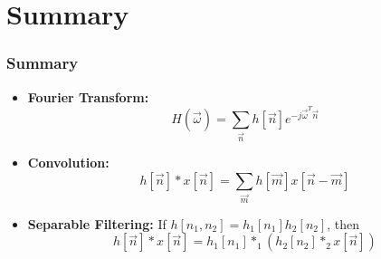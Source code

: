 \documentclass{beamer}
\begin{document}
\section{Summary}
\setcounter{subsection}{1}

\begin{frame}
  \frametitle{Summary}
  \begin{itemize}
  \item {\bf Fourier Transform:}
    \[
    H(\vec\omega) = \sum_{\vec{n}} h[\vec{n}] e^{-j\vec\omega^T\vec{n}}
    \]
  \item {\bf Convolution:}
    \[
    h[\vec{n}]\ast x[\vec{n}] = \sum_{\vec{m}} h[\vec{m}] x[\vec{n}-\vec{m}]
    \]
  \item {\bf Separable Filtering:}
    If $h[n_1,n_2]=h_1[n_1]h_2[n_2]$, then
    \[
    h[\vec{n}]\ast x[\vec{n}] = h_1[n_1] \ast_1 \left(h_2[n_2]\ast_2 x[\vec{n}]\right)
    \]
  \end{itemize}
\end{frame}
\end{document}
